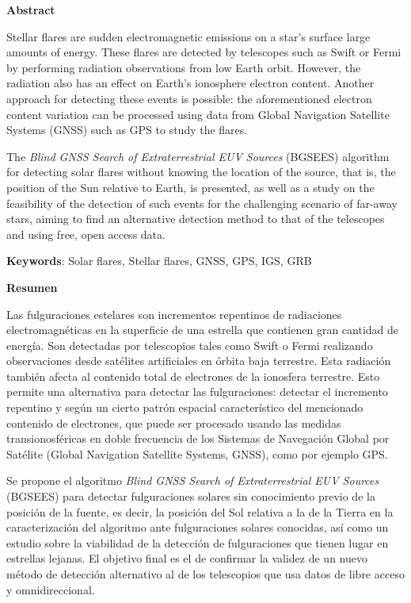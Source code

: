 \thispagestyle{empty}
\begin{center}
    \Large
    \textbf{Abstract}
\end{center}
Stellar flares are sudden electromagnetic emissions on a star's surface  large amounts of energy. These flares are detected by telescopes such as Swift or Fermi by performing radiation observations from low Earth orbit. However, the radiation also has an effect on Earth’s ionosphere electron content. Another approach for detecting these events is possible: the aforementioned electron content variation can be processed using data from Global Navigation Satellite Systems (GNSS) such as GPS to study the flares.

The \textit{Blind GNSS Search of Extraterrestrial EUV Sources} (BGSEES) algorithm for detecting solar flares without knowing the location of the source, that is, the position of the Sun relative to Earth, is presented, as well as a study on the feasibility of the detection of such events for the challenging scenario of far-away stars, aiming to find an alternative detection method to that of the telescopes and using free, open access data.

\textbf{Keywords}: Solar flares, Stellar flares, GNSS, GPS, IGS, GRB

\clearpage
\thispagestyle{empty}
\begin{center}
	\Large
	\textbf{Resumen}
\end{center}
Las fulguraciones estelares son incrementos repentinos de radiaciones electromagnéticas en la superficie de una estrella que contienen gran cantidad de energía. Son detectadas por telescopios tales como Swift o Fermi realizando observaciones desde satélites artificiales en órbita baja terrestre. Esta radiación también afecta al contenido total de electrones de la ionosfera terrestre. Esto permite una alternativa para detectar las fulguraciones: detectar el incremento repentino y según un cierto patrón espacial característico del mencionado contenido de electrones, que puede ser procesado usando las medidas transionosféricas en doble frecuencia de los Sistemas de Navegación Global por Satélite (Global Navigation Satellite Systems, GNSS), como por ejemplo GPS.

Se propone el algoritmo \textit{Blind GNSS Search of Extraterrestrial EUV Sources} (BGSEES) para detectar fulguraciones solares sin conocimiento previo de la posición de la fuente, es decir, la posición del Sol relativa a la de la Tierra en la caracterización del algoritmo ante fulguraciones solares conocidas, así como un estudio sobre la viabilidad de la detección de fulguraciones que tienen lugar en estrellas lejanas. El objetivo final es el de confirmar la validez de un nuevo método de detección alternativo al de los telescopios que usa datos de libre acceso y omnidireccional.

